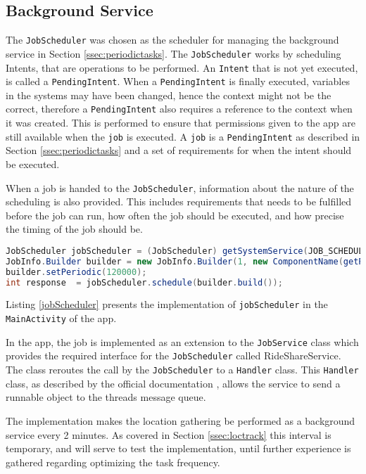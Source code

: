 \subsection{Background Service}
The \texttt{JobScheduler} was chosen as the scheduler for managing the background service in Section \ref{ssec:periodictasks}.
The \texttt{JobScheduler} works by scheduling Intents, that are operations to be performed. 
An \texttt{Intent} that is not yet executed, is called a \texttt{PendingIntent}.
When a \texttt{PendingIntent} is finally executed, variables in the systems may have been changed, hence the context might not be the correct, therefore a \texttt{PendingIntent} also requires a reference to the context when it was created.
This is performed to ensure that permissions given to the app are still available when the \texttt{job} is executed.
A \texttt{job} is a \texttt{PendingIntent} as described in Section \ref{ssec:periodictasks} and a set of requirements for when the intent should be executed.

When a job is handed to the \texttt{JobScheduler}, information about the nature of the scheduling is also provided.
This includes requirements that needs to be fulfilled before the job can run, how often the job should be executed, and how precise the timing of the job should be.

\begin{lstlisting}[language=Java, label=jobScheduler, caption=The implementation of jobScheduler.]
JobScheduler jobScheduler = (JobScheduler) getSystemService(JOB_SCHEDULER_SERVICE);
JobInfo.Builder builder = new JobInfo.Builder(1, new ComponentName(getPackageName(), RideShareService.class.getName()));
builder.setPeriodic(120000);
int response  = jobScheduler.schedule(builder.build());	
\end{lstlisting}

Listing \ref{jobScheduler} presents the implementation of \texttt{jobScheduler} in the \texttt{MainActivity} of the app.

In the app, the job is implemented as an extension to the \texttt{JobService} class which provides the required interface for the \texttt{JobScheduler} called RideShareService.
The class reroutes the call by the \texttt{JobScheduler} to a \texttt{Handler} class.
This \texttt{Handler} class, as described by the official documentation \cite{handler}, allows the service to send a runnable object to the threads message queue.


The implementation makes the location gathering be performed as a background service every 2 minutes.
As covered in Section \ref{ssec:loctrack} this interval is temporary, and will serve to test the implementation, until further experience is gathered regarding optimizing the task frequency.



